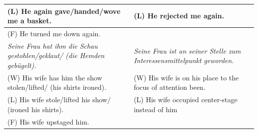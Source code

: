 \documentclass[output=paper]{langsci/langscibook}
\begin{document}
\begin{table}[]
{\begin{tabular}{|l|l|}
(L) He again gave/handed/wove me a basket.                                      & (L) He rejected me again.                                                     \\ \hline
(F) He turned me down again.                                                    &                                                                               \\ \hline
\textit{Seine Frau hat ihm die Schau gestohlen/geklaut/ (die Hemden gebügelt).} & \textit{Seine Frau ist an seiner Stelle zum Interessensmittelpunkt geworden.} \\ \hline
(W) His wife has him the show stolen/lifted/ (his shirts ironed).               & (W) His wife is on his place to the focus of attention been.                  \\ \hline
(L) His wife stole/lifted his show/ (ironed his shirts).                        & (L) His wife occupied center-stage instead of him                             \\ \hline
(F) His wife upstaged him.                                                      &                                                                               \\ \hline
\end{tabular}}

\end{table}
\end{document}
